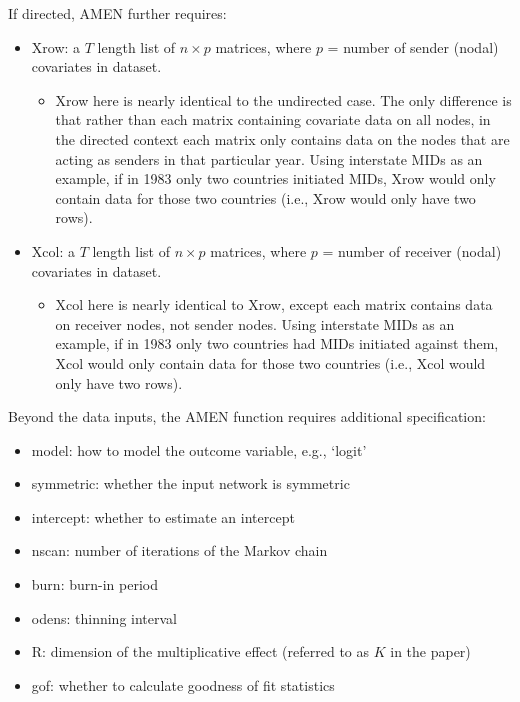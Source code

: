 If directed, AMEN further requires:

\begin{itemize}[noitemsep,nolistsep]
    \item Xrow: a $T$ length list of $n\times p$ matrices, where $p$ = number of sender (nodal) covariates in dataset.
    \begin{itemize}
      \item Xrow here is nearly identical to the undirected case. The only difference is that rather than each matrix containing covariate data on all nodes, in the directed context each matrix only contains data on the nodes that are acting as senders in that particular year. Using interstate MIDs as an example, if in 1983 only two countries initiated MIDs, Xrow would only contain data for those two countries (i.e., Xrow would only have two rows).
    \end{itemize}
    \item Xcol: a $T$ length list of $n\times p$ matrices, where $p$ = number of receiver (nodal) covariates in dataset.
    \begin{itemize}
      \item Xcol here is nearly identical to Xrow, except each matrix contains data on receiver nodes, not sender nodes. Using interstate MIDs as an example, if in 1983 only two countries had MIDs initiated against them, Xcol would only contain data for those two countries (i.e., Xcol would only have two rows).
    \end{itemize}
\end{itemize}

Beyond the data inputs, the AMEN function requires additional specification:

\begin{itemize}
    \item model: how to model the outcome variable, e.g., `logit'
    \item symmetric: whether the input network is symmetric
    \item intercept: whether to estimate an intercept
    \item nscan: number of iterations of the Markov chain
    \item burn: burn-in period
    \item odens: thinning interval
    \item R: dimension of the multiplicative effect (referred to as $K$ in the paper)
    \item gof: whether to calculate goodness of fit statistics
\end{itemize}

